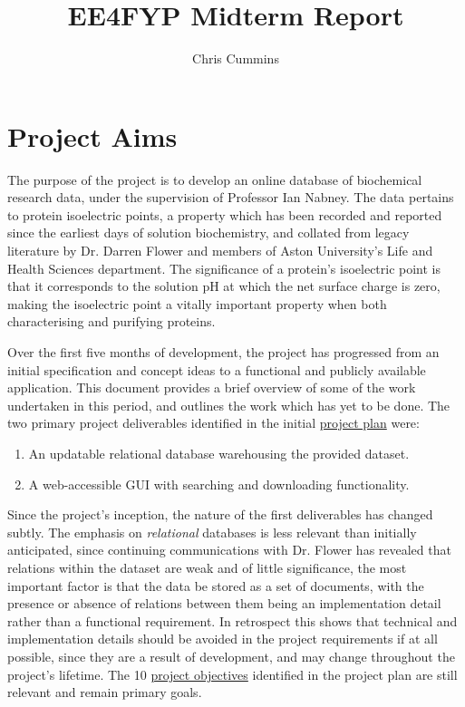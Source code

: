 \documentclass[12pt,a4paper]{article}
\title{EE4FYP Midterm Report}
\author{Chris Cummins}
\begin{document}
\maketitle

\section{Project Aims}

The purpose of the project is to develop an online database of
biochemical research data, under the supervision of Professor Ian
Nabney. The data pertains to protein isoelectric points, a property
which has been recorded and reported since the earliest days of
solution biochemistry, and collated from legacy literature by
Dr. Darren Flower and members of Aston University’s Life and Health
Sciences department. The significance of a protein's isoelectric point
is that it corresponds to the solution pH at which the net surface
charge is zero, making the isoelectric point a vitally important
property when both characterising and purifying proteins.

Over the first five months of development, the project has progressed
from an initial specification and concept ideas to a functional and
publicly available application. This document provides a brief
overview of some of the work undertaken in this period, and outlines
the work which has yet to be done. The two primary project
deliverables identified in the initial
\href{https://github.com/ChrisCummins/pip-db/blob/master/Documentation/ProjectPlan.md}{project
  plan} were:

\begin{enumerate}
\item An updatable relational database warehousing the provided dataset.
\item A web-accessible GUI with searching and downloading functionality.
\end{enumerate}

Since the project's inception, the nature of the first deliverables
has changed subtly. The emphasis on \textit{relational} databases is
less relevant than initially anticipated, since continuing
communications with Dr. Flower has revealed that relations within the
dataset are weak and of little significance, the most important factor
is that the data be stored as a set of documents, with the presence or
absence of relations between them being an implementation detail
rather than a functional requirement. In retrospect this shows that
technical and implementation details should be avoided in the project
requirements if at all possible, since they are a result of
development, and may change throughout the project's lifetime. The 10
\href{https://github.com/ChrisCummins/pip-db/blob/master/Documentation/ProjectPlan.md#objectives}{project
  objectives} identified in the project plan are still relevant and
remain primary goals.
\end{document}
